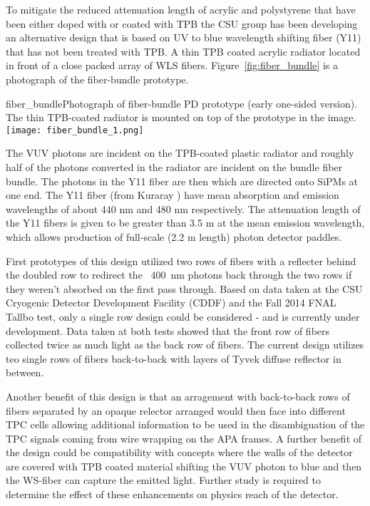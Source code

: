 To mitigate the reduced attenuation length of acrylic and polystyrene
that have been either doped with or coated with TPB the CSU group has
been developing an alternative design that is based on UV to blue
wavelength shifting fiber (Y11) that has not been treated with TPB.  A
thin TPB coated acrylic radiator located in front of a close packed
array of WLS fibers. Figure~\ref{fig:fiber_bundle} is a photograph of the
fiber-bundle prototype. 

\begin{cdrfigure}{fiber_bundle}{Photograph of fiber-bundle PD prototype (early one-sided
  version). The thin TPB-coated radiator is mounted on top of the
  prototype in the image.}
  \texttt{[image: fiber\_bundle\_1.png]}
\end{cdrfigure}


The VUV photons are incident on the TPB-coated plastic radiator and
roughly half of the photons converted in the radiator are incident on
the bundle fiber bundle. The photons in the Y11 fiber are then which
are directed onto SiPMs at one end. The Y11 fiber (from Kuraray ) have
mean absorption and emission wavelengths of about 440 nm and 480 nm
respectively.  The attenuation length of the Y11 fibers is given to be
greater than 3.5 m at the mean emission wavelength, which allows
production of full-scale (2.2 m length) photon detector paddles.

First prototypes of this design utilized two rows of fibers with a
reflecter behind the doubled row to redirect the ~400~nm photons back
through the two rows if they weren't absorbed on the first pass
through. Based on data taken at the CSU Cryogenic Detector Development
Facility (CDDF) and the Fall 2014 FNAL Tallbo test, only a single row
design could be considered - and is currently under development. Data
taken at both tests showed that the front row of fibers collected
twice as much light as the back row of fibers. The current design
utilizes teo single rows of fibers back-to-back with layers of Tyvek
diffuse reflector in between.

Another benefit of this design is that an arragement with back-to-back
rows of fibers separated by an opaque relector arranged would then
face into different TPC cells allowing additional information to be
used in the disambiguation of the TPC signals coming from wire
wrapping on the APA frames. A further benefit of the design could be
compatibility with concepts where the walls of the detector are
covered with TPB coated material shifting the VUV photon to blue and
then the WS-fiber can capture the emitted light. Further study is
required to determine the effect of these enhancements on physics
reach of the detector. 

